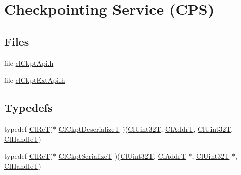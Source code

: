 \hypertarget{group__group10}{
\section{Checkpointing Service (CPS)}
\label{group__group10}
}
\subsection*{Files}
\begin{CompactItemize}
\item 
file \hyperlink{cl_ckpt_api_8h}{cl\-Ckpt\-Api.h}
\item 
file \hyperlink{cl_ckpt_ext_api_8h}{cl\-Ckpt\-Ext\-Api.h}
\end{CompactItemize}
\subsection*{Typedefs}
\begin{CompactItemize}
\item 
typedef \hyperlink{group__group2_ga18}{Cl\-Rc\-T}($\ast$ \hyperlink{group__group10_ga1}{Cl\-Ckpt\-Deserialize\-T} )(\hyperlink{group__group2_ga1}{Cl\-Uint32T}, \hyperlink{group__group2_ga16}{Cl\-Addr\-T}, \hyperlink{group__group2_ga1}{Cl\-Uint32T}, \hyperlink{group__group2_ga10}{Cl\-Handle\-T})
\item 
typedef \hyperlink{group__group2_ga18}{Cl\-Rc\-T}($\ast$ \hyperlink{group__group10_ga0}{Cl\-Ckpt\-Serialize\-T} )(\hyperlink{group__group2_ga1}{Cl\-Uint32T}, \hyperlink{group__group2_ga16}{Cl\-Addr\-T} $\ast$, \hyperlink{group__group2_ga1}{Cl\-Uint32T} $\ast$, \hyperlink{group__group2_ga10}{Cl\-Handle\-T})
\end{CompactItemize}
